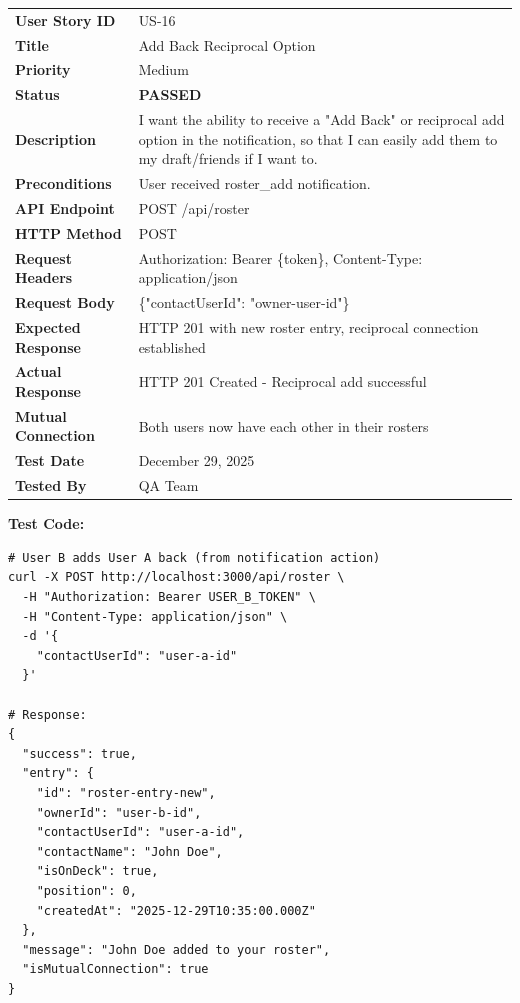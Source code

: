 \documentclass[11pt,a4paper]{article}
\newcommand{\passed}{\textcolor{pass}{\textbf{PASSED}}}
\begin{document}
\begin{tabularx}{\textwidth}{|p{3.2cm}|Y|}
\hline
{}
 \\
\hline
\textbf{User Story ID} & US-16 \\
\hline
\textbf{Title} & Add Back Reciprocal Option \\
\hline
\textbf{Priority} & Medium \\
\hline
\textbf{Status} & \passed \\
\hline
\textbf{Description} & I want the ability to receive a "Add Back" or reciprocal add option in the notification, so that I can easily add them to my draft/friends if I want to. \\
\hline
\textbf{Preconditions} & User received roster\_add notification. \\
\hline
\textbf{API Endpoint} & POST /api/roster \\
\hline
\textbf{HTTP Method} & POST \\
\hline
\textbf{Request Headers} & Authorization: Bearer \{token\}, Content-Type: application/json \\
\hline
\textbf{Request Body} & \{"contactUserId": "owner-user-id"\} \\
\hline
\textbf{Expected Response} & HTTP 201 with new roster entry, reciprocal connection established \\
\hline
\textbf{Actual Response} & HTTP 201 Created - Reciprocal add successful \\
\hline
\textbf{Mutual Connection} & Both users now have each other in their rosters \\
\hline
\textbf{Test Date} & December 29, 2025 \\
\hline
\textbf{Tested By} & QA Team \\
\hline
\end{tabularx}

\vspace{0.3cm}
\textbf{Test Code:}
\begin{lstlisting}
# User B adds User A back (from notification action)
curl -X POST http://localhost:3000/api/roster \
  -H "Authorization: Bearer USER_B_TOKEN" \
  -H "Content-Type: application/json" \
  -d '{
    "contactUserId": "user-a-id"
  }'

# Response:
{
  "success": true,
  "entry": {
    "id": "roster-entry-new",
    "ownerId": "user-b-id",
    "contactUserId": "user-a-id",
    "contactName": "John Doe",
    "isOnDeck": true,
    "position": 0,
    "createdAt": "2025-12-29T10:35:00.000Z"
  },
  "message": "John Doe added to your roster",
  "isMutualConnection": true
}
\end{lstlisting}
\end{document}
